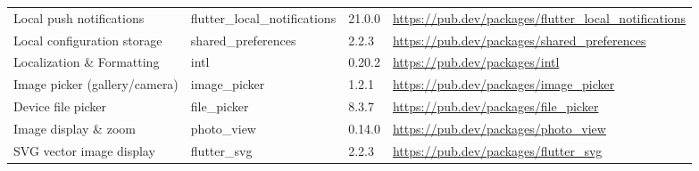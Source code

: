 \documentclass[../Main.tex]{subfiles}
\begin{document}
\begin{longtable}{ p{} p{} p{} p{} }
    Local push notifications        & flutter\_local\newline\_notifications & 21.0.0           & \url{https://pub.dev/packages/flutter_local_notifications}      \\
    Local configuration storage     & shared\_preferences                   & 2.2.3            & \url{https://pub.dev/packages/shared_preferences}               \\
    Localization \& Formatting      & intl                                  & 0.20.2           & \url{https://pub.dev/packages/intl}                             \\
    Image picker (gallery/camera)   & image\_picker                         & 1.2.1            & \url{https://pub.dev/packages/image_picker}                     \\
    Device file picker              & file\_picker                          & 8.3.7            & \url{https://pub.dev/packages/file_picker}                      \\
    Image display \& zoom           & photo\_view                           & 0.14.0           & \url{https://pub.dev/packages/photo_view}                       \\
    SVG vector image display        & flutter\_svg                          & 2.2.3            & \url{https://pub.dev/packages/flutter_svg}                      \\ \hline


\end{longtable}
\end{document}
